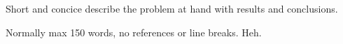 Short and concice describe the problem at hand with results and conclusions.

Normally max 150 words, no references or line breaks. Heh.
